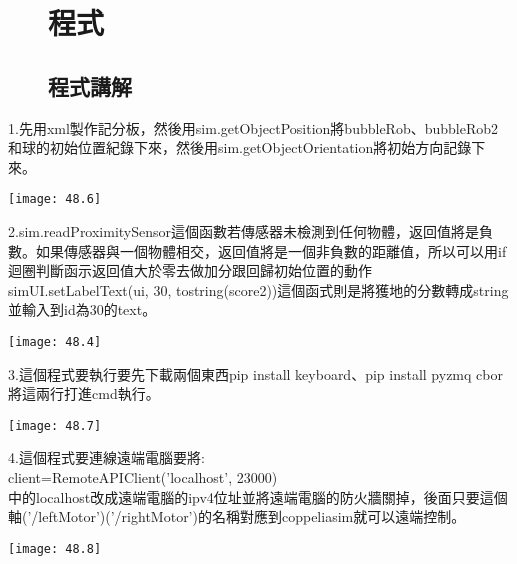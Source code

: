 \newpage
\begin{figure}[hbt!]
\chapter{程式}
\section{程式講解}
\end{figure}
1.先用xml製作記分板，然後用sim.getObjectPosition將bubbleRob、bubbleRob2和球的初始位置紀錄下來，然後用sim.getObjectOrientation將初始方向記錄下來。
\begin{center}
\texttt{[image: 48.6]}
\end{center}

2.sim.readProximitySensor這個函數若傳感器未檢測到任何物體，返回值將是負數。如果傳感器與一個物體相交，返回值將是一個非負數的距離值，所以可以用if迴圈判斷函示返回值大於零去做加分跟回歸初始位置的動作
simUI.setLabelText(ui, 30, tostring(score2))這個函式則是將獲地的分數轉成string並輸入到id為30的text。
\begin{center}
\texttt{[image: 48.4]}
\end{center}
\newpage
3.這個程式要執行要先下載兩個東西pip install keyboard、pip install pyzmq cbor將這兩行打進cmd執行。
\begin{center}
\texttt{[image: 48.7]}
\end{center}

4.這個程式要連線遠端電腦要將:\\
client=RemoteAPIClient('localhost', 23000)\\
中的localhost改成遠端電腦的ipv4位址並將遠端電腦的防火牆關掉，後面只要這個軸('/leftMotor')('/rightMotor')的名稱對應到coppeliasim就可以遠端控制。
\begin{center}
\texttt{[image: 48.8]}
\end{center}